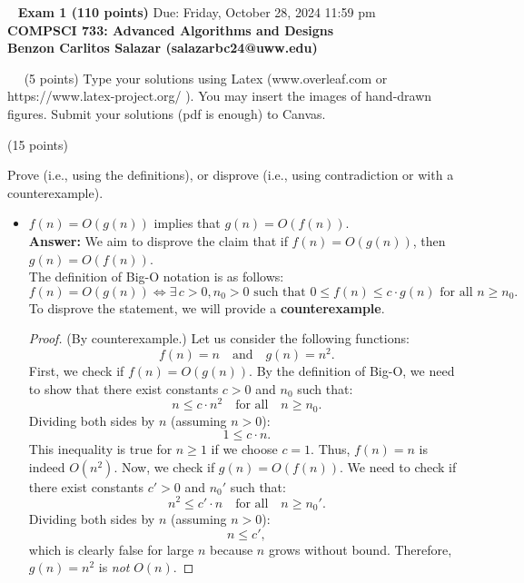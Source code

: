 \documentclass[12pt]{article}
\theoremstyle{plain}
\newcommand{\vs}{\vspace{2mm}}
\newcommand{\ls}{\vspace{5mm}}
\newcommand{\bc}{\begin{center}}
\newcommand{\ec}{\end{center}}
\begin{document}
\bc\ 
 { \bf Exam 1 (110 points)} Due: Friday, October 28, 2024 11:59 pm\\
 { \bf COMPSCI 733: Advanced Algorithms and Designs } \\ 
 { \bf Benzon Carlitos Salazar (salazarbc24@uww.edu) } 
\ec\
\ls\
 (5 points)
Type your solutions using Latex (www.overleaf.com or https://www.latex-project.org/ ). You may insert the images of hand-drawn figures. Submit your solutions (pdf is enough) to Canvas.
\ls\

\noindent{\bf Problem 1: } (15 points) 
\vs\

Prove (i.e., using the definitions), or disprove (i.e., using contradiction or with a counterexample).

\begin{itemize}
    \item[(a)] $f(n) = O(g(n))$ implies that $g(n) = O(f(n)).$ \\
        \textbf{Answer: }We aim to disprove the claim that if \( f(n) = O(g(n)) \), then \( g(n) = O(f(n)) \). \\
        The definition of Big-O notation is as follows:
        \[f(n) = O(g(n)) \iff \exists \, c > 0, n_0 > 0 \text{ such that } 0 \leq f(n) \leq c \cdot g(n) \text{ for all } n \geq n_0.\]
        To disprove the statement, we will provide a \textbf{counterexample}.
        \begin{proof} (By counterexample.) Let us consider the following functions:
            \[f(n) = n \quad \text{and} \quad g(n) = n^2.\]
            First, we check if \( f(n) = O(g(n)) \). By the definition of Big-O, we need to show that there exist constants \( c > 0 \) and \( n_0 \) such that: \[n \leq c \cdot n^2 \quad \text{for all} \quad n \geq n_0.\] Dividing both sides by \( n \) (assuming \( n > 0 \)): \[1 \leq c \cdot n.\]
            This inequality is true for \( n \geq 1 \) if we choose \( c = 1 \). Thus, \( f(n) = n \) is indeed \( O(n^2) \).
            Now, we check if \( g(n) = O(f(n)) \). We need to check if there exist constants \( c' > 0 \) and \( n_0' \) such that: \[n^2 \leq c' \cdot n \quad \text{for all} \quad n \geq n_0'.\] Dividing both sides by \( n \) (assuming \( n > 0 \)): \[n \leq c',\] which is clearly false for large \( n \) because \( n \) grows without bound. Therefore, \( g(n) = n^2 \) is \emph{not} \( O(n) \).
        \end{proof}
        \newpage
        

\end{itemize}
\end{document}
